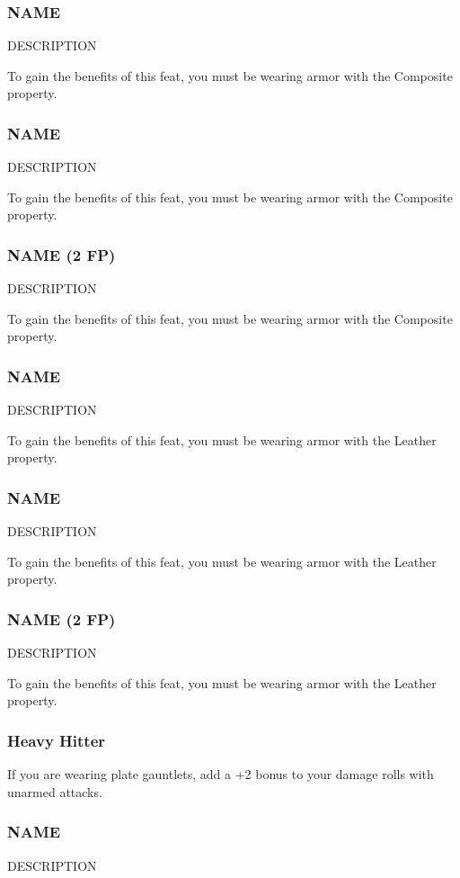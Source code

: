 \subsubsection{NAME} \label{feat::name}
    DESCRIPTION

    To gain the benefits of this feat, you must be wearing armor with the Composite property.
\subsubsection{NAME} \label{feat::name}
    DESCRIPTION

    To gain the benefits of this feat, you must be wearing armor with the Composite property.
\subsubsection{NAME (2 FP)} \label{feat::name}
    DESCRIPTION

    To gain the benefits of this feat, you must be wearing armor with the Composite property.
\subsubsection{NAME} \label{feat::name}
    DESCRIPTION

    To gain the benefits of this feat, you must be wearing armor with the Leather property.
\subsubsection{NAME} \label{feat::name}
    DESCRIPTION

    To gain the benefits of this feat, you must be wearing armor with the Leather property.
\subsubsection{NAME (2 FP)} \label{feat::name}
    DESCRIPTION

    To gain the benefits of this feat, you must be wearing armor with the Leather property.
\subsubsection{Heavy Hitter} \label{feat::heavyhitter}
    If you are wearing plate gauntlets, add a +2 bonus to your damage rolls with unarmed attacks.
\subsubsection{NAME} \label{feat::name}
    DESCRIPTION

